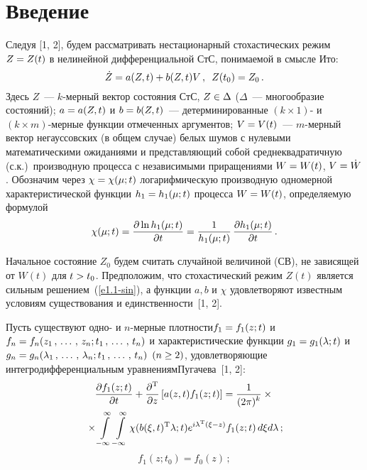       \begin{multicols}{2}

            \label{st\stat}



\section{Введение}

Следуя [1, 2], будем рассматривать нестационарный стохастических режим $Z\hm=Z(t)$ 
в нелинейной дифференциальной СтС, понимаемой в смысле Ито:
    \begin{equation}
    \dot Z = a(Z,t) + b (Z,t) V\,, \enskip Z(t_0) = Z_0\,.
    \label{e1.1-sin}
    \end{equation}
Здесь $Z$~--- $k$-мер\-ный вектор состояния СтС, $Z\hm\in \Delta$ ($\Delta$~--- 
многообразие состояний); $a\hm=a(Z,t)$ и $b\hm= b(Z,t)$~--- детерминированные  
$(k\times 1)$- и $(k\times m)$-мер\-ные  функции  отмеченных аргументов; 
$V\hm=V(t)$~--- $m$-мер\-ный вектор негауссовских (в общем случае) белых шумов 
с нулевыми математическими ожиданиями и представляющий собой среднеквадратичную 
(с.к.)\ производную процесса с независимыми приращениями  $W\hm=W(t)$, 
$V\hm=\dot W$. Обозначим через $\chi\hm=\chi(\mu;t)$ логарифмическую производную 
одномерной характеристической функции $h_1\hm=h_1(\mu;t)$ процесса $W\hm=W(t)$, определяемую формулой
    \begin{equation}
    \chi(\mu;t)=\displaystyle\frac{\displaystyle \partial \ln h_1 (\mu;t)\mathstrut}{\displaystyle \partial t\mathstrut}=
    \displaystyle\frac{\displaystyle 1\mathstrut}{\displaystyle h_1(\mu;t)\mathstrut}\,\displaystyle\frac{\displaystyle \partial h_1(\mu;t)\mathstrut}{\displaystyle \partial t\mathstrut}\,.
    \label{e1.2-sin}
    \end{equation}

Начальное состояние $Z_0$ будем считать случайной величиной (СВ), не зависящей 
от $W(t)$ для $t\hm>t_0$. Предположим, что стохастический режим $Z(t)$ является 
сильным решением~(\ref{e1.1-sin}), а функции $a,b$ и $\chi$ удовлетворяют известным 
условиям существования и единственности~[1, 2].

Пусть существуют одно- и $n$-мерные плот\-ности\linebreak $f_1\hm=f_1(z;t)$ и 
$f_n\hm= f_n(z_1\tr z_n; t_1 \tr t_n)$ и характеристические функции $g_1\hm=g_1(\la;t)$ и 
$g_n\hm=g_n(\la_1\tr \la_n; t_1\tr t_n)$ $(n\hm\ge 2)$, удовлетворяющие 
интегродифференциальным уравнениям\linebreak Пугачева~[1, 2]:
    \begin{multline}
    \displaystyle\frac{\displaystyle \partial f_1(z;t)\mathstrut}{\displaystyle \partial t\mathstrut}+\displaystyle\frac{\displaystyle \partial^{\mathrm{T}}\mathstrut}{\displaystyle \partial z\mathstrut}\left[ a(z,t)f_1(z;t)\right] = 
\displaystyle\frac{\displaystyle 1\mathstrut}{\displaystyle (2 \pi)^k\mathstrut} \times{}\\
{}\times \int\limits_{-\infty}^\infty\int\limits_{-\infty}^\infty \chi(b(\xi,t)^{\mathrm{T}}\lambda;t) e^{i\lambda^{\mathrm{T}}(\xi-z)} f_1(z;t) \,
    d\xi d\lambda\,;
    \label{e1.3-sin}
    \end{multline}
   \begin{equation}
    f_1(z;t_0)=f_0(z)\,;\label{e1.4-sin}
    \end{equation}
    

\end{multicols}

